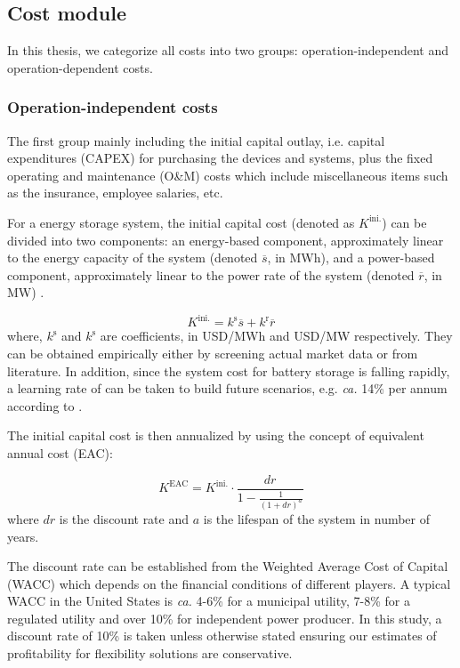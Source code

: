 \subsection{Cost module}
\label{sec:cost}
In this thesis, we categorize all costs into two groups: operation-independent and operation-dependent costs.

\subsubsection{Operation-independent costs}

The first group mainly including the initial capital outlay, i.e. capital expenditures (CAPEX) for purchasing the devices and systems, plus the fixed operating and maintenance (O\&M) costs which include miscellaneous items such as the insurance, employee salaries, etc. 

For a energy storage system, the initial capital cost (denoted as $K^{\text{ini.}}$) can be divided into two components: an energy-based component, approximately linear to the energy capacity of the system (denoted $\overline{s}$, in MWh), and a power-based component, approximately linear to the power rate of the system (denoted $\overline{r}$, in MW) \cite{Megel2017}. %

\begin{equation}
\label{eq:initial-cost}
K^{\text{ini.}}  = k^{\text{s}} \overline{s} + k^{\text{r}} \overline{r} %
\end{equation}
where, $k^{\text{s}}$ and $k^{\text{s}}$ are coefficients, in USD/MWh and USD/MW respectively. They can be obtained empirically either by screening actual market data or from literature. In addition, since the system cost for battery storage is falling rapidly, a learning rate of  can be taken to build future scenarios, e.g. \textit{ca.} 14\% per annum according to \cite{Nykvist2015}.

The initial capital cost is then annualized by using the concept of equivalent annual cost (EAC):

\begin{equation}
K^{\text{EAC}} = K^{\text{ini.}}  \cdot \frac{dr}{1 - \frac{1}{(1+dr)^a}}
\end{equation}
where $dr$ is the discount rate and $a$ is the lifespan of the system in number of years.

The discount rate can be established from the Weighted Average Cost of Capital (WACC) which depends on the financial conditions of different players. A typical WACC in the United States is \textit{ca.} 4-6\% for a municipal utility, 7-8\% for a regulated utility and over 10\% for independent power producer\cite{Rastler2010}. In this study, a discount rate of 10\% is taken unless otherwise stated ensuring our estimates of profitability for flexibility solutions are conservative.

